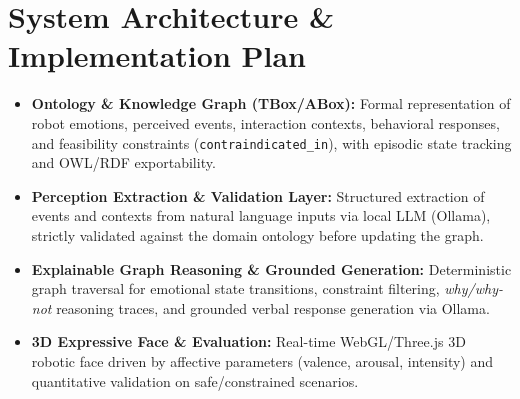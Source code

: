 \documentclass[11pt,a4paper]{article}
\begin{document}
\vspace{6pt}

\section*{System Architecture \& Implementation Plan}
\begin{itemize}
    \item \textbf{Ontology \& Knowledge Graph (TBox/ABox):} Formal representation of robot emotions, perceived events, interaction contexts, behavioral responses, and feasibility constraints (\texttt{contraindicated\_in}), with episodic state tracking and OWL/RDF exportability.
    \item \textbf{Perception Extraction \& Validation Layer:} Structured extraction of events and contexts from natural language inputs via local LLM (Ollama), strictly validated against the domain ontology before updating the graph.
    \item \textbf{Explainable Graph Reasoning \& Grounded Generation:} Deterministic graph traversal for emotional state transitions, constraint filtering, \textit{why/why-not} reasoning traces, and grounded verbal response generation via Ollama.
    \item \textbf{3D Expressive Face \& Evaluation:} Real-time WebGL/Three.js 3D robotic face driven by affective parameters (valence, arousal, intensity) and quantitative validation on safe/constrained scenarios.
\end{itemize}
\end{document}
